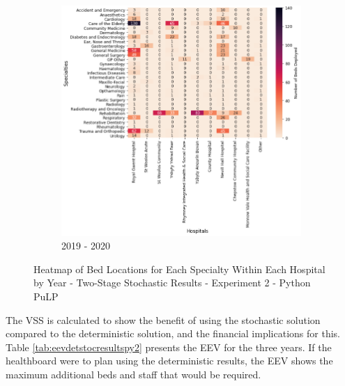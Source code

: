 \documentclass[../thesis.tex]{subfiles}
\begin{document}
\hfill
\begin{figure}\ContinuedFloat
     \begin{subfigure}{0.8\textwidth}
         \centering
         \includegraphics[width=\textwidth]{Chapters/Chapter5/Figures/python2019stoch.png}
         \caption{2019 - 2020}
         \label{fig:stocexppy2c}
     \end{subfigure}
        \caption{Heatmap of Bed Locations for Each Specialty Within Each Hospital by Year - Two-Stage Stochastic Results - Experiment 2 - Python PuLP}
        \label{fig:stocexppy2}
\end{figure}

The VSS is calculated to show the benefit of using the stochastic solution compared to the deterministic solution, and the financial implications for this. Table \ref{tab:eevdetstocresultspy2} presents the EEV for the three years. If the healthboard were to plan using the deterministic results, the EEV shows the maximum additional beds and staff that would be required.
\end{document}
